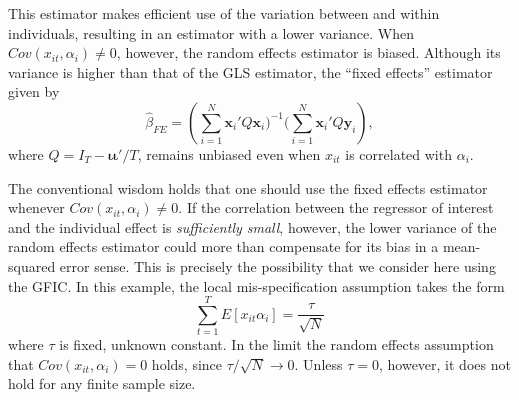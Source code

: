 This estimator makes efficient use of the variation between and within individuals, resulting in an estimator with a lower variance.
When $Cov(x_{it},\alpha_i)\neq 0$, however, the random effects estimator is biased. 
Although its variance is higher than that of the GLS estimator, the ``fixed effects'' estimator given by 
\begin{equation}
  \widehat{\beta}_{FE} = \left(\sum_{i=1}^{N} \mathbf{x}_i' Q \mathbf{x}_i\bigg)^{-1}\bigg(\sum_{i=1}^{N} \mathbf{x}_i' Q\mathbf{y}_i   \right),
  \label{eq:FEdef}
\end{equation}
where $Q=I_T - \boldsymbol{\iota}\boldsymbol{\iota}'/T$, remains unbiased even when $x_{it}$ is correlated with $\alpha_i$. 

The conventional wisdom holds that one should use the fixed effects estimator whenever $Cov(x_{it},\alpha_i)\neq 0$.
If the correlation between the regressor of interest and the individual effect is \emph{sufficiently small}, however, the lower variance of the random effects estimator could more than compensate for its bias in a mean-squared error sense.
This is precisely the possibility that we consider here using the GFIC.
In this example, the local mis-specification assumption takes the form
\begin{equation}
  \sum_{t=1}^T E\left[ x_{it}\alpha_i \right] = \frac{\tau}{\sqrt{N}}
  \label{eq:REvsFElocalmisp}
\end{equation}
where $\tau$ is fixed, unknown constant.
In the limit the random effects assumption that $Cov(x_{it},\alpha_i)=0$ holds, since $\tau/\sqrt{N} \rightarrow 0$.
Unless $\tau=0$, however, it does not hold for any finite sample size.
